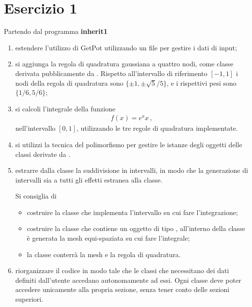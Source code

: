 \section*{Esercizio 1}

Partendo dal programma \textbf{inherit1}
\begin{enumerate}
    \item estendere l'utilizzo di GetPot utilizzando un file per gestire
        i dati di input;

    \item si aggiunga la regola di quadratura gaussiana a quattro nodi,
        come classe derivata pubblicamente da .
        Rispetto all'intervallo di riferimento $[-1,1]$ i nodi della
        regola di quadratura sono $\{ \pm 1, \pm \sqrt{5} / 5 \}$, e
        i rispettivi pesi sono $\{ 1/6, 5/6 \}$;

    \item si calcoli l'integrale della funzione
        \begin{align*}
            f(x) = e^x x\,,
        \end{align*}
        nell'intervallo $[0,1]$, utilizzando le tre regole
        di quadratura implementate.

    \item si utilizzi la tecnica del polimorfismo per gestire le
        istanze degli oggetti delle classi derivate da
        .

    \item estrarre dalla classe  la
        suddivisione in intervalli, in modo che la generazione di
        intervalli sia a tutti gli effetti estranea alla classe.

        Si consiglia di
        \begin{itemize}
            \item costruire la classe  che implementa
                l'intervallo su cui fare l'integrazione;

            \item costruire la classe  che contiene un
                oggetto di tipo , all'interno della
                classe  \`e generata la mesh equi-spaziata
                su cui fare l'integrale;

            \item la classe  conterr\`a la
                mesh e la regola di quadratura.

        \end{itemize}

    \item riorganizzare il codice in modo tale che le classi che
        necessitano dei dati definiti dall'utente accedano
        autonomamente ad essi. Ogni classe deve poter accedere
        unicamente alla propria sezione, senza tener conto delle sezioni
        superiori.

\end{enumerate}
